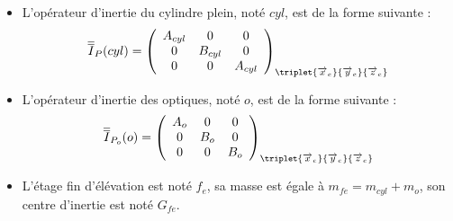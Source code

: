 \begin{itemize}
\item L'opérateur d'inertie du cylindre plein, noté $cyl$, est de la forme suivante :
\begin{align*}
\overline{\overline{I}}_P(cyl)=
\left(
\begin{array}{ccc}
A_{cyl} & 0 & 0 \\ 
0 & B_{cyl} & 0 \\ 
0 & 0 & A_{cyl}
\end{array}
\right)_{\triplet{\overrightarrow{x}_e}{\overrightarrow{y}_e}{\overrightarrow{z}_e}} 
\end{align*}
\item L'opérateur d'inertie des optiques, noté $o$, est de la forme suivante :
\begin{align*}
\overline{\overline{I}}_{P_o}(o)=
\left(
\begin{array}{ccc}
A_{o} & 0 & 0 \\ 
0 & B_{o} & 0 \\ 
0 & 0 & B_{o}
\end{array}
\right)_{\triplet{\overrightarrow{x}_e}{\overrightarrow{y}_e}{\overrightarrow{z}_e}} 
\end{align*}
\item L'étage fin d'élévation est noté $f_e$, sa masse est égale à $m_{fe}=m_{cyl}+m_o$, son centre d'inertie est noté $G_{fe}$.
\end{itemize}


